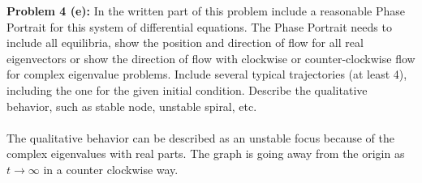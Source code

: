\documentclass[12pt]{article}
\begin{document}
\noindent \textbf{Problem 4 (e): }In the written part of this problem include a reasonable Phase Portrait for this system of differential equations. The Phase Portrait needs to include all equilibria, show the position and direction of flow for all real eigenvectors or show the direction of flow with clockwise or counter-clockwise flow for complex eigenvalue problems. Include several typical trajectories (at least 4), including the one for the given initial condition. Describe the qualitative behavior, such as stable node, unstable spiral, etc.
\\ \\
The qualitative behavior can be described as an unstable focus because of the complex eigenvalues with real parts. The graph is going away from the origin as $t \rightarrow \infty$ in a counter clockwise way.

\newpage 
\end{document}
